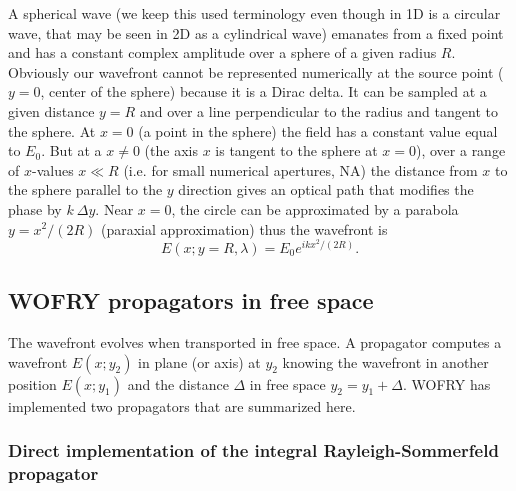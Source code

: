 \documentclass[preprint]{iucr}              %
\begin{document}
A spherical wave (we keep this used terminology even though in 1D is a circular wave, that may be seen in 2D as a cylindrical wave) emanates from a fixed point and has a constant complex amplitude over a sphere of a given radius $R$.
Obviously our wavefront cannot be represented numerically at the source point ($y=0$, center of the sphere) because it is a Dirac delta. It can be sampled at a given distance $y=R$ and over a line perpendicular to the radius and tangent to the sphere. 
At $x=0$ (a point in the sphere) the field has a constant value equal to $E_0$. But at a $x{\ne}0$ (the axis $x$ is tangent to the sphere at $x=0$), over a range of $x$-values $x{\ll}R$ (i.e. for small numerical apertures, NA) the distance from $x$ to the sphere parallel to the $y$ direction gives an optical path that modifies the phase by $k ~\Delta y$. Near $x=0$, the circle can be approximated by a parabola $y=x^2/(2R)$ (paraxial approximation) thus the wavefront is
\begin{equation}
\label{eq:sphericalWave}
    E(x;y=R,\lambda)  = E_0 e^{i k x^2 / (2 R)}.
\end{equation}


\subsection{WOFRY propagators in free space }
\label{sec:wofryPropagators}


The wavefront evolves when transported in free space. A propagator computes a wavefront $E(x;y_2)$ in plane (or axis) at $y_2$ knowing the wavefront in another position $E(x;y_1)$ and the distance $\Delta$ in free space $y_2 = y_1 + \Delta$.
WOFRY has implemented two propagators that are summarized here.

\subsubsection{Direct implementation of the integral Rayleigh-Sommerfeld propagator}
\label{sec:integralPropagator}
\end{document}
